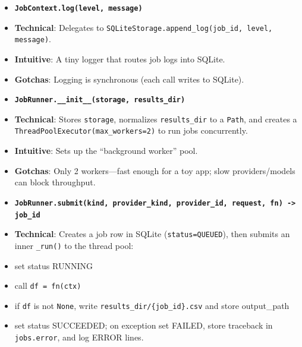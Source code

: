 \documentclass[11pt]{article}
\begin{document}
\begin{itemize}[leftmargin=*,nosep]
\item \textbf{\texttt{JobContext.log(level, message)}}
\item \textbf{Technical}: Delegates to \texttt{SQLiteStorage.append\_log(job\_id, level, message)}.
\item \textbf{Intuitive}: A tiny logger that routes job logs into SQLite.
\item \textbf{Gotchas}: Logging is synchronous (each call writes to SQLite).
\end{itemize}


\begin{itemize}[leftmargin=*,nosep]
\item \textbf{\texttt{JobRunner.\_\_init\_\_(storage, results\_dir)}}
\item \textbf{Technical}: Stores \texttt{storage}, normalizes \texttt{results\_dir} to a \texttt{Path}, and creates a \texttt{ThreadPoolExecutor(max\_workers=2)} to run jobs concurrently.
\item \textbf{Intuitive}: Sets up the “background worker” pool.
\item \textbf{Gotchas}: Only 2 workers—fast enough for a toy app; slow providers/models can block throughput.
\end{itemize}


\begin{itemize}[leftmargin=*,nosep]
\item \textbf{\texttt{JobRunner.submit(kind, provider\_kind, provider\_id, request, fn) -> job\_id}}
\item \textbf{Technical}: Creates a job row in SQLite (\texttt{status=QUEUED}), then submits an inner \texttt{\_run()} to the thread pool:
\item set status RUNNING
\end{itemize}


\begin{itemize}[leftmargin=*,nosep]
\item call \texttt{df = fn(ctx)}
\end{itemize}


\begin{itemize}[leftmargin=*,nosep]
\item if \texttt{df} is not \texttt{None}, write \texttt{results\_dir/\{job\_id\}.csv} and store output\_path
\end{itemize}


\begin{itemize}[leftmargin=*,nosep]
\item set status SUCCEEDED; on exception set FAILED, store traceback in \texttt{jobs.error}, and log ERROR lines.
\end{itemize}
\end{document}
